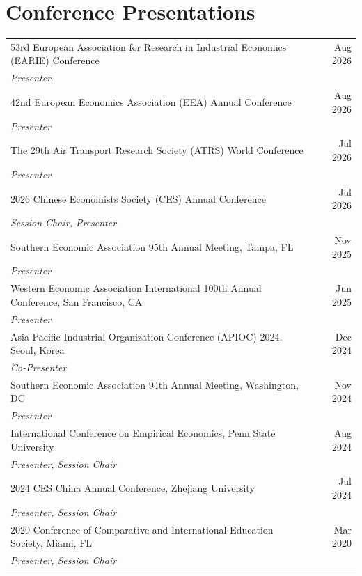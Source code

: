 \documentclass[11pt,letterpaper]{article}
\begin{document}
\section{Conference Presentations}
\begin{tabular}{p{} r}
53rd European Association for Research in Industrial Economics (EARIE) Conference & Aug 2026\\
\quad\textit{Presenter} & \\[2pt]
42nd European Economics Association (EEA) Annual Conference & Aug 2026\\
\quad\textit{Presenter} & \\[2pt]
The 29th Air Transport Research Society (ATRS) World Conference & Jul 2026\\
\quad\textit{Presenter} & \\[2pt]
2026 Chinese Economists Society (CES) Annual Conference & Jul 2026\\
\quad\textit{Session Chair, Presenter} & \\[2pt]
Southern Economic Association 95th Annual Meeting, Tampa, FL & Nov 2025\\
\quad\textit{Presenter} & \\[2pt]
Western Economic Association International 100th Annual Conference, San Francisco, CA & Jun 2025\\
\quad\textit{Presenter} & \\[2pt]
Asia-Pacific Industrial Organization Conference (APIOC) 2024, Seoul, Korea & Dec 2024\\
\quad\textit{Co-Presenter} & \\[2pt]
Southern Economic Association 94th Annual Meeting, Washington, DC & Nov 2024\\
\quad\textit{Presenter} & \\[2pt]
International Conference on Empirical Economics, Penn State University & Aug 2024\\
\quad\textit{Presenter, Session Chair} & \\[2pt]
2024 CES China Annual Conference, Zhejiang University & Jul 2024\\
\quad\textit{Presenter, Session Chair} & \\[2pt]
2020 Conference of Comparative and International Education Society, Miami, FL & Mar 2020\\
\quad\textit{Presenter, Session Chair} & \\
\end{tabular}
\end{document}
